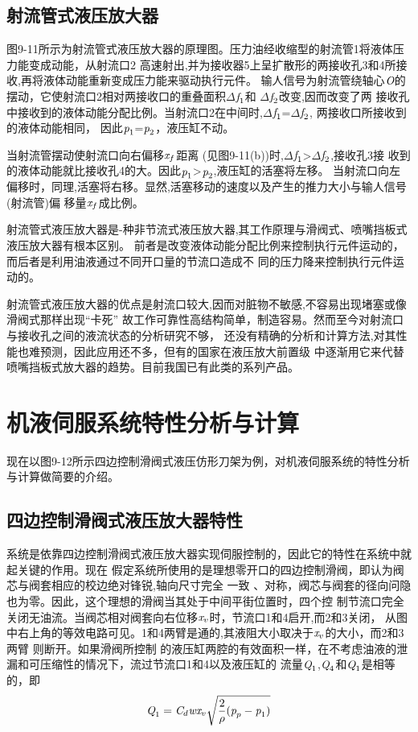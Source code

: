  \subsection{射流管式液压放大器}
 图9-11所示为射流管式液压放大器的原理图。压力油经收缩型的射流管1将液体压力能变成动能，从射流口2
 高速射出,并为接收器5上呈扩散形的两接收孔3和4所接收,再将液体动能重新变成压力能来驱动执行元件。
 输人信号为射流管绕轴心$\emph{O}$的摆动，它使射流口2相对两接收口的重叠面积$\Delta$$\emph{f}_1$和
 $\Delta$$\emph{f}_2$改变,因而改变了两
 接收孔中接收到的液体动能分配比例。当射流口2在中间时,$\Delta$$\emph{f}_1$=$\Delta$$\emph{f}_2$,
 两接收口所接收到的液体动能相同，
 因此$\emph{p}_1$=$\emph{p}_2$，液压缸不动。
 
 当射流管摆动使射流口向右偏移$\emph{x}_f$距离
 (见图9-11(b))时,$\Delta$$\emph{f}_1$\textgreater $\Delta$$\emph{f}_2$,接收孔3接
 收到的液体动能就比接收孔4的大。因此$\emph{p}_1$\textgreater $\emph{p}_2$,液压缸的活塞将左移。
 当射流口向左偏移时，同理,活塞将右移。显然,活塞移动的速度以及产生的推力大小与输人信号(射流管)偏
 移量$\emph{x}_f$成比例。

 射流管式液压放大器是-种非节流式液压放大器,其工作原理与滑阀式、喷嘴挡板式液压放大器有根本区别。
 前者是改变液体动能分配比例来控制执行元件运动的，而后者是利用油液通过不同开口量的节流口造成不
 同的压力降来控制执行元件运动的。

 射流管式液压放大器的优点是射流口较大,因而对脏物不敏感,不容易出现堵塞或像滑阀式那样出现“卡死”
 故工作可靠性高结构简单，制造容易。然而至今对射流口与接收孔之间的液流状态的分析研究不够，
 还没有精确的分析和计算方法,对其性能也难预测，因此应用还不多，但有的国家在液压放大前置级
 中逐渐用它来代替喷嘴挡板式放大器的趋势。目前我国已有此类的系列产品。
 \section{机液伺服系统特性分析与计算}
 现在以图9-12所示四边控制滑阀式液压仿形刀架为例，对机液伺服系统的特性分析与计算做简要的介绍。
 \subsection{四边控制滑阀式液压放大器特性}
 系统是依靠四边控制滑阀式液压放大器实现伺服控制的，因此它的特性在系统中就起关键的作用。现在
 假定系统所使用的是理想零开口的四边控制滑阀，即认为阀芯与阀套相应的校边绝对锋锐,轴向尺寸完全
 一致 、对称，阀芯与阀套的径向问隐也为零。因此，这个理想的滑阀当其处于中间平街位置时，四个控
 制节流口完全关闭无油流。当阀芯相对阀套向右位移$\emph{x}_v$时，节流口1和4启开,而2和3关闭，
 从图中右上角的等效电路可见。1和4两臂是通的,其液阻大小取决于$\emph{x}_v$的大小，而2和3两臂
 则断开。如果滑阀所控制
 的液压缸两腔的有效面积一样，在不考虑油液的泄漏和可压缩性的情况下，流过节流口1和4以及液压缸的
 流量$\emph{Q}_1$,$\emph{Q}_4$和$\emph{Q}_1$是相等的，即
 \begin{equation}
    \emph{Q}_1=\emph{C}_d\emph{w}\emph{x}_v\sqrt{\frac{2}{\rho}(\emph{p}_p-\emph{p}_1)}
 \end{equation}
